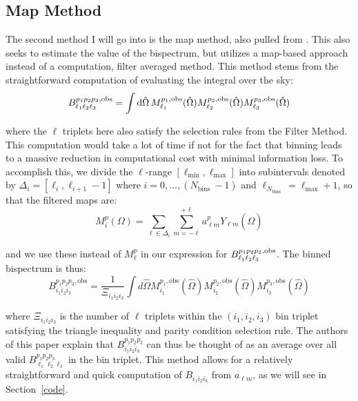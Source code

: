 \documentclass[11pt]{article}
\renewcommand{\_}[1]{\underline{ #1 }}
\newcommand{\npar}{\vspace{.3cm}\newline}
\begin{document}
{\subsection{Map Method}\label{mapmethod}

The second method I will go into is the map method, also pulled from \cite{Bucher_2016}. This also seeks to estimate the value of the bispectrum, but utilizes a map-based approach instead of a computation, filter averaged method.
\npar
This method stems from the straightforward computation of evaluating the integral over the sky:
\begin{equation}
    B_{\ell_1 \ell_2 \ell_3}^{p_1 p_2 p_3, \rm{obs}} = \int \dd{\hat{\Omega}} M_{\ell_1}^{p_1, \rm{obs}}(\hat{\Omega}) M_{\ell_2}^{p_2, \rm{obs}}(\hat{\Omega}) M_{\ell_3}^{p_3, \rm{obs}}(\hat{\Omega})
\end{equation}

where the $\ell$ triplets here also satisfy the selection rules from the Filter Method. This computation would take a lot of time if not for the fact that binning leads to a massive reduction in computational cost with minimal information loss. To accomplish this, we divide the $\ell$-range $\left[\ell_{\min }, \ell_{\max }\right]$ into subintervals denoted by $\Delta_i=\left[\ell_i, \ell_{i+1}-1\right]$ where $i=0, \ldots,\left(N_{\text {bins }}-1\right)$ and $\ell_{N_{\text {bins }}}=\ell_{\max }+1$, so that the filtered maps are:
\begin{equation}
M_i^p(\Omega)=\sum_{\ell \in \Delta_i} \sum_{m=-\ell}^{+\ell} a_{\ell m}^p Y_{\ell m}(\hat{\Omega})
\end{equation}

and we use these instead of $M_{\ell}^p$ in our expression for $B_{\ell_1 \ell_2 \ell_3}^{p_1 p_2 p_3, \rm{obs}}$. The binned bispectrum is thus:
\begin{equation}
    B_{i_1 i_2 i_3}^{p_1 p_2 p_3, \mathrm{obs}}=\frac{1}{\Xi_{i_1 i_2 i_3}} \int d \hat{\Omega} M_{i_1}^{p_1, \mathrm{obs}}(\hat{\Omega}) M_{i_2}^{p_2, \mathrm{obs}}(\hat{\Omega}) M_{i_3}^{p_3, \mathrm{obs}}(\hat{\Omega})
\end{equation}

where $\Xi_{i_1 i_2 i_3}$ is the number of $\ell$ triplets within the $\left(i_1, i_2, i_3\right)$ bin triplet satisfying the triangle inequality and parity condition selection rule. The authors of this paper explain that $B_{i_1 i_2 i_3}^{p_1 p_2 p_3}$ can thus be thought of as an average over all valid $B_{\ell_1 \ell_2 \ell_3}^{p_1 p_2 p_3}$ in the bin triplet.
\npar
This method allows for a relatively straightforward and quick computation of $B_{i_1 i_2 i_3}$ from $a_{\ell m}$, as we will see in Section~\ref{code}.

}
\end{document}
